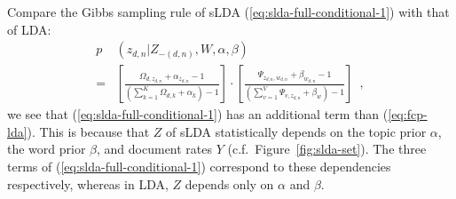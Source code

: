 Compare the Gibbs sampling rule of sLDA
(\ref{eq:slda-full-conditional-1}) with that of LDA:
\begin{equation}
  \label{eq:fcp-lda}
  \begin{split}
    p&(z_{d,n}|Z_{-(d,n)},W,\alpha,\beta)
    \\
    =&
    \left[ \frac{
        \Omega_{d,z_{d,n}} + \alpha_{z_{d,n}} - 1
      }{
        \left( \sum_{k=1}^K  \Omega_{d,k} + \alpha_k \right) - 1
      } \right]
    \cdot
    \left[ \frac{
        \Psi_{z_{d,n},w_{d,n}} + \beta_{w_{d,n}} - 1
      }{
        \left( \sum_{v=1}^V  \Psi_{v,z_{d,n}} + \beta_w \right) - 1
      } \right]
    \enspace,
  \end{split}
\end{equation}
we see that (\ref{eq:slda-full-conditional-1}) has an additional term
than (\ref{eq:fcp-lda}).  This is because that $Z$ of sLDA
statistically depends on the topic prior $\alpha$, the word prior
$\beta$, and document rates $Y$ (c.f.~Figure~\ref{fig:slda-set}).  The
three terms of (\ref{eq:slda-full-conditional-1}) correspond to these
dependencies respectively, whereas in LDA, $Z$ depends only on
$\alpha$ and $\beta$.

